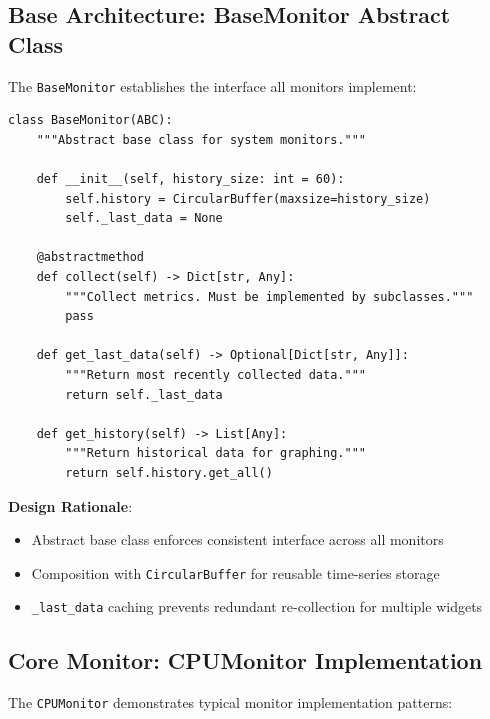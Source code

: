 \documentclass[12pt,a4paper,oneside]{report}
\begin{document}
\subsection{Base Architecture: BaseMonitor Abstract Class}

The \texttt{BaseMonitor} establishes the interface all monitors implement:

\begin{lstlisting}
class BaseMonitor(ABC):
    """Abstract base class for system monitors."""
    
    def __init__(self, history_size: int = 60):
        self.history = CircularBuffer(maxsize=history_size)
        self._last_data = None
    
    @abstractmethod
    def collect(self) -> Dict[str, Any]:
        """Collect metrics. Must be implemented by subclasses."""
        pass
    
    def get_last_data(self) -> Optional[Dict[str, Any]]:
        """Return most recently collected data."""
        return self._last_data
    
    def get_history(self) -> List[Any]:
        """Return historical data for graphing."""
        return self.history.get_all()
\end{lstlisting}

\textbf{Design Rationale}:
\begin{itemize}
    \item Abstract base class enforces consistent interface across all monitors
    \item Composition with \texttt{CircularBuffer} for reusable time-series storage
    \item \texttt{\_last\_data} caching prevents redundant re-collection for multiple widgets
\end{itemize}

\subsection{Core Monitor: CPUMonitor Implementation}

The \texttt{CPUMonitor} demonstrates typical monitor implementation patterns:
\end{document}

